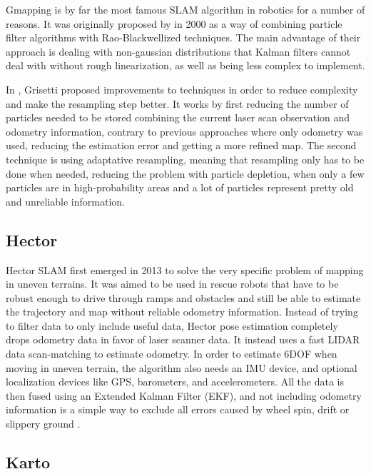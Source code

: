 Gmapping is by far the most famous SLAM algorithm in robotics for a number of reasons. It was originally proposed by \citeauthor{doucet2000rao} in 2000 as a way of combining particle filter algorithms with Rao-Blackwellized techniques. The main advantage of their approach is dealing with non-gaussian distributions that Kalman filters cannot deal with without rough linearization, as well as being less complex to implement.

In \cite{grisetti2007improved}, Grisetti proposed improvements to \citeauthor{doucet2000rao} techniques in order to reduce complexity and make the resampling step better. It works by first reducing the number of particles needed to be stored combining the current laser scan observation and odometry information, contrary to previous approaches where only odometry was used, reducing the estimation error and getting a more refined map. The second technique is using adaptative resampling, meaning that resampling only has to be done when needed, reducing the problem with particle depletion, when only a few particles are in high-probability areas and a lot of particles represent pretty old and unreliable information.

\subsection{Hector}

Hector SLAM first emerged in 2013 to solve the very specific problem of mapping in uneven terrains. It was aimed to be used in rescue robots that have to be robust enough to drive through ramps and obstacles and still be able to estimate the trajectory and map without reliable odometry information. Instead of trying to filter data to only include useful data, Hector pose estimation completely drops odometry data in favor of laser scanner data. It instead uses a fast LIDAR data scan-matching to estimate odometry. In order to estimate 6DOF when moving in uneven terrain, the algorithm also needs an IMU device, and optional localization devices like GPS, barometers, and accelerometers. All the data is then fused using an Extended Kalman Filter (EKF), and not including odometry information is a simple way to exclude all errors caused by wheel spin, drift or slippery ground \cite{kohlbrecher2011flexible}.

\subsection{Karto}

